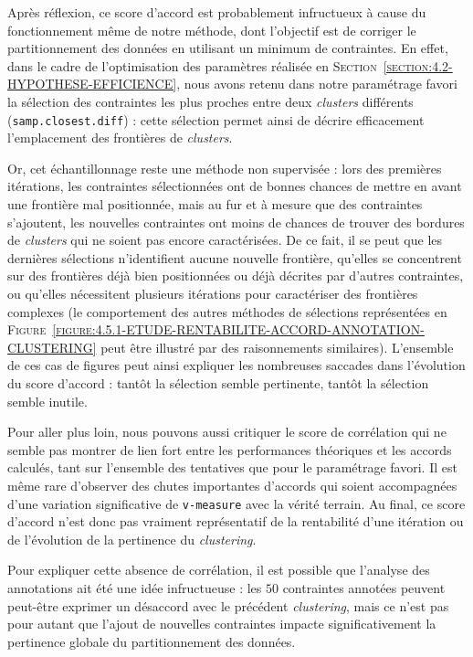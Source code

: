 			\begin{leftBarAuthorOpinion}
				Après réflexion, ce score d'accord est probablement infructueux à cause du fonctionnement même de notre méthode, dont l'objectif est de corriger le partitionnement des données en utilisant un minimum de contraintes.
				En effet, dans le cadre de l'optimisation des paramètres réalisée en \textsc{Section~\ref{section:4.2-HYPOTHESE-EFFICIENCE}}, nous avons retenu dans notre paramétrage favori la sélection des contraintes les plus proches entre deux \textit{clusters} différents (\texttt{samp.closest.diff}) : cette sélection permet ainsi de décrire efficacement l'emplacement des frontières de \textit{clusters}.
				
				Or, cet échantillonnage reste une méthode non supervisée : lors des premières itérations, les contraintes sélectionnées ont de bonnes chances de mettre en avant une frontière mal positionnée, mais au fur et à mesure que des contraintes s'ajoutent, les nouvelles contraintes ont moins de chances de trouver des bordures de \textit{clusters} qui ne soient pas encore caractérisées.
				De ce fait, il se peut que les dernières sélections n'identifient aucune nouvelle frontière, qu'elles se concentrent sur des frontières déjà bien positionnées ou déjà décrites par d'autres contraintes, ou qu'elles nécessitent plusieurs itérations pour caractériser des frontières complexes (le comportement des autres méthodes de sélections représentées en \textsc{Figure~\ref{figure:4.5.1-ETUDE-RENTABILITE-ACCORD-ANNOTATION-CLUSTERING}} peut être illustré par des raisonnements similaires).
				L'ensemble de ces cas de figures peut ainsi expliquer les nombreuses saccades dans l'évolution du score d'accord : tantôt la sélection semble pertinente, tantôt la sélection semble inutile.
			\end{leftBarAuthorOpinion}
			
			Pour aller plus loin, nous pouvons aussi critiquer le score de corrélation qui ne semble pas montrer de lien fort entre les performances théoriques et les accords calculés, tant sur l'ensemble des tentatives que pour le paramétrage favori.
			Il est même rare d'observer des chutes importantes d'accords qui soient accompagnées d'une variation significative de \texttt{v-measure} avec la vérité terrain.
			Au final, ce score d'accord n'est donc pas vraiment représentatif de la rentabilité d'une itération ou de l'évolution de la pertinence du \textit{clustering}.
			\begin{leftBarAuthorOpinion}
				Pour expliquer cette absence de corrélation, il est possible que l'analyse des annotations ait été une idée infructueuse : les $50$ contraintes annotées peuvent peut-être exprimer un désaccord avec le précédent \textit{clustering}, mais ce n'est pas pour autant que l'ajout de nouvelles contraintes impacte significativement la pertinence globale du partitionnement des données.
			\end{leftBarAuthorOpinion}
			
